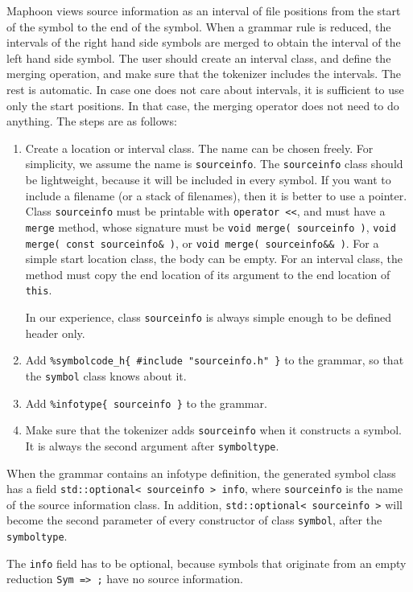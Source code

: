 \documentclass{article}
\begin{document}
Maphoon views source information as an interval of file
positions from the start of the symbol to the end of the symbol.
When a grammar rule is reduced, the intervals of the right
hand side symbols are merged to obtain the interval of the left
hand side symbol. The user should create an interval class, 
and define the merging operation, and make sure that
the tokenizer includes the intervals.  The rest is automatic. 
In case one does not care about intervals, it is sufficient
to use only the start positions. In that case,
the merging operator does not need to do anything.
The steps are as follows:
\begin{enumerate}
\item
   Create a location or interval class. 
   The name can be chosen freely. For simplicity,
   we assume the name is \verb+sourceinfo+. 
   The \verb+sourceinfo+ class should be lightweight,
   because it will be included in every symbol.
   If you want to include a filename (or a stack of filenames),
   then it is better to use a pointer. 
   Class \verb+sourceinfo+ must be printable with \verb+operator <<+, 
   and must have a \verb+merge+ method, whose
   signature must be \verb+void merge( sourceinfo )+,
   \verb+void merge( const sourceinfo& )+, or
   \verb+void merge( sourceinfo&& )+. 
   For a simple start location class, the body can be empty.
   For an interval class, the method must copy the end location
   of its argument to the end location of \verb+this+.

   In our experience, class \verb+sourceinfo+ is always simple enough
   to be defined header only. 
\item
   Add \verb+%symbolcode_h{ #include "sourceinfo.h" }+ to the grammar,
   so that the \verb+symbol+ class knows about it.
\item
   Add \verb+%infotype{ sourceinfo }+ to the grammar. 
\item
   Make sure that the tokenizer adds \verb+sourceinfo+
   when it constructs a symbol. It is always the
   second argument after \verb+symboltype+. 
\end{enumerate}

\noindent
When the grammar contains an infotype definition, the generated symbol class 
has a field 
\verb+std::optional< sourceinfo > info+, where \verb+sourceinfo+
is the name of the source information class. 
In addition, \verb+std::optional< sourceinfo >+ will become 
the second parameter
of every constructor of class \verb+symbol+,
after the \verb+symboltype+.

The \verb+info+ field has to be optional, 
because symbols that originate
from an empty reduction \verb+Sym => ;+ have no source information.
\end{document}
